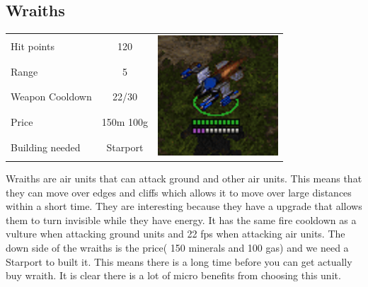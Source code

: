 \subsection{Wraiths}
\begin{table}[H]
	\begin{tabular}{| l | c | c}
		\cline{1-2}
		Hit points		& 120		&\multirow{5}{*}{\includegraphics[scale=.4]
									{Figures/Units/wraith.png}}	\\ \cline{1-2}
		Range			& 5 		&\\ \cline{1-2}
		Weapon Cooldown	& 22/30	 	&\\ \cline{1-2}
		Price			& 150m 100g	&\\ \cline{1-2}
		Building needed	& Starport	&\\ \cline{1-2}
	\end{tabular}
\end{table}
Wraiths are air units that can attack ground and other air units. This means that they can move over edges and cliffs which allows it
to move over large distances within a short time. They are interesting because they have a upgrade that allows them to turn invisible while they have energy. It has the same fire cooldown
as a vulture when attacking ground units and 22 fps when attacking air units.  
The down side of the wraiths is the price( 150 minerals and 100 gas) and we need a Starport to built it. This means
there is a long time before you can get actually buy wraith. It is clear there is a lot of micro benefits from choosing this unit. 


